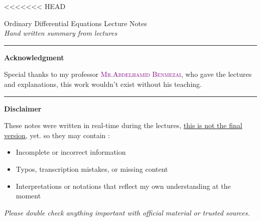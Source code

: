 \documentclass{report}
\begin{document}
<<<<<<< HEAD
\begin{titlepage}
  \begin{center}
    \vspace*{2cm}
    {\LARGE Ordinary Differential Equations Lecture Notes}
    \\
    \vspace{1cm}
    {\large \it Hand written summary from lectures}
    \normalfont
  \end{center}
  \rule{\textwidth}{0.4pt}
  \begin{center}
    \textbf{Acknowledgment}
  \end{center}
  \begin{center}
    Special thanks to my professor \textsc{\textcolor{purple}{\large Mr.Abdelhamid Benmezai}}\normalfont,
    who gave the lectures and explanations,
    this work wouldn't exist without his teaching.
  \end{center}
  \begin{center}
  \rule{\textwidth}{0.4pt}
    \textbf{Disclaimer}
  \end{center}
  \begin{center}
    These notes were written in real-time
    during the lectures,
    \underline{this is not the final version}, yet. so they may contain :
    \begin{itemize}
      \item
        Incomplete or incorrect information
      \item
        Typos, transcription mistakes, or missing content
      \item
        Interpretations or notations that reflect my own understanding
        at the moment
    \end{itemize}
  \end{center}
  \vfill
  \begin{center}
    \it
    \large
    Please double check anything important with official
    material or trusted sources. \normalfont
  \end{center}
\end{titlepage}
\end{document}
